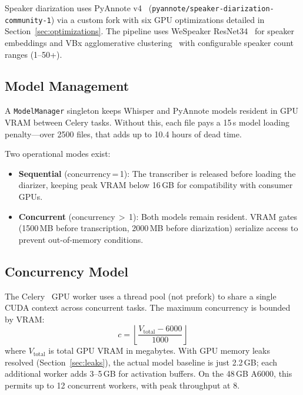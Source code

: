 \documentclass[conference,10pt]{IEEEtran}
\begin{document}
Speaker diarization uses PyAnnote
v4~\cite{bredin2023pyannote21,bredin2020pyannote}
(\texttt{pyannote/speaker-diarization-community-1}) via a custom fork with six
GPU optimizations detailed in Section~\ref{sec:optimizations}. The pipeline
uses WeSpeaker ResNet34~\cite{wang2023wespeaker} for speaker embeddings and
VBx agglomerative clustering~\cite{landini2022vbx} with configurable speaker
count ranges (1--50+).

\subsection{Model Management}

A \texttt{ModelManager} singleton keeps Whisper and PyAnnote models resident in
GPU VRAM between Celery tasks. Without this, each file pays a 15\,s model
loading penalty---over \num{2500} files, that adds up to 10.4 hours of dead
time.

Two operational modes exist:
\begin{itemize}[nosep,leftmargin=*]
  \item \textbf{Sequential} (concurrency\,=\,1): The transcriber is released
    before loading the diarizer, keeping peak VRAM below 16\,GB for
    compatibility with consumer GPUs.
  \item \textbf{Concurrent} (concurrency\,$>$\,1): Both models remain resident.
    VRAM gates (\num{1500}\,MB before transcription, \num{2000}\,MB before
    diarization) serialize access to prevent out-of-memory conditions.
\end{itemize}

\subsection{Concurrency Model}

The Celery~\cite{celery2024} GPU worker uses a thread pool (not prefork) to share a single CUDA
context across concurrent tasks. The maximum concurrency is bounded by VRAM:
\begin{equation}
  c = \left\lfloor\frac{V_{\text{total}} - 6000}{1000}\right\rfloor
  \label{eq:concurrency}
\end{equation}
where $V_{\text{total}}$ is total GPU VRAM in megabytes. With GPU memory leaks
resolved (Section~\ref{sec:leaks}), the actual model baseline is just 2.2\,GB;
each additional worker adds 3--5\,GB for activation buffers. On the 48\,GB
A6000, this permits up to 12 concurrent workers, with peak throughput at 8.
\end{document}
